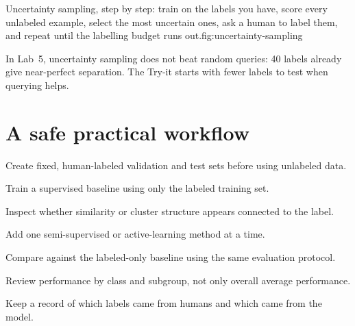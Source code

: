 \begin{utpfig}{Uncertainty sampling, step by step: train on the labels you have, score every unlabeled example, select the most uncertain ones, ask a human to label them, and repeat until the labelling budget runs out.}{fig:uncertainty-sampling}
\end{utpfig}

In Lab~5, uncertainty sampling does not beat random queries: 40 labels already give near-perfect separation. The Try-it starts with fewer labels to test when querying helps.

\section{A safe practical workflow}

\begin{utpsteps}
  \item Create fixed, human-labeled validation and test sets before using unlabeled data.
  \item Train a supervised baseline using only the labeled training set.
  \item Inspect whether similarity or cluster structure appears connected to the label.
  \item Add one semi-supervised or active-learning method at a time.
  \item Compare against the labeled-only baseline using the same evaluation protocol.
  \item Review performance by class and subgroup, not only overall average performance.
  \item Keep a record of which labels came from humans and which came from the model.
\end{utpsteps}

